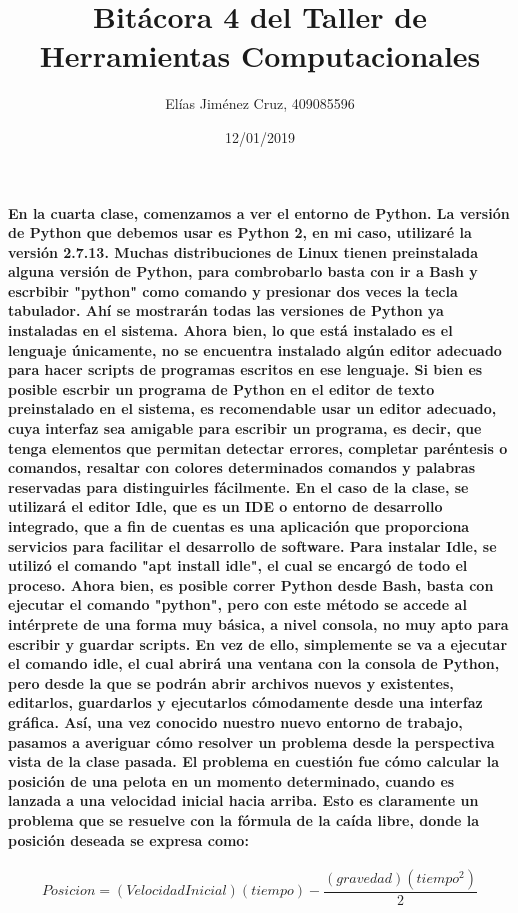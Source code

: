 \documentclass[letterpaper, 12pt, oneside]{article} %
\title{\Huge Bitácora 4 del Taller de Herramientas Computacionales}
\author{Elías Jiménez Cruz, 409085596}
\date{12/01/2019}
\begin{document}
	\maketitle
	\paragraph{En la cuarta clase, comenzamos a ver el entorno de Python. La versión de Python que debemos usar es Python 2, en mi caso, utilizaré la versión 2.7.13. Muchas distribuciones de Linux tienen preinstalada alguna versión de Python, para combrobarlo basta con ir a Bash y escrbibir "python" como comando y presionar dos veces la tecla tabulador. Ahí se mostrarán todas las versiones de Python ya instaladas en el sistema. Ahora bien, lo que está instalado es el lenguaje únicamente, no se encuentra instalado algún editor adecuado para hacer scripts de programas escritos en ese lenguaje. Si bien es posible escrbir un programa de Python en el editor de texto preinstalado en el sistema, es recomendable usar un editor adecuado, cuya interfaz sea amigable para escribir un programa, es decir, que tenga elementos que permitan detectar errores, completar paréntesis o comandos, resaltar con colores determinados comandos y palabras reservadas para distinguirles fácilmente. En el caso de la clase, se utilizará el editor Idle, que es un IDE o entorno de desarrollo integrado, que a fin de cuentas es una aplicación que proporciona servicios para facilitar el desarrollo de software. Para instalar Idle, se utilizó el comando "apt install idle", el cual se encargó de todo el proceso. Ahora bien, es posible correr Python desde Bash, basta con ejecutar el comando "python", pero con este método se accede al intérprete de una forma muy básica, a nivel consola, no muy apto para escribir y guardar scripts. En vez de ello, simplemente se va a ejecutar el comando idle, el cual abrirá una ventana con la consola de Python, pero desde la que se podrán abrir archivos nuevos y existentes, editarlos, guardarlos y ejecutarlos cómodamente desde una interfaz gráfica. Así, una vez conocido nuestro nuevo entorno de trabajo, pasamos a averiguar cómo resolver un problema desde la perspectiva vista de la clase pasada. El problema en cuestión fue cómo calcular la posición de una pelota en un momento determinado, cuando es lanzada a una velocidad inicial hacia arriba. Esto es claramente un problema que se resuelve con la fórmula de la caída libre, donde la posición deseada se expresa como:}
	\begin{equation}
		Posicion = (VelocidadInicial)(tiempo) - \frac{(gravedad)(tiempo^2)}{2}
	\end{equation}
\end{document}
